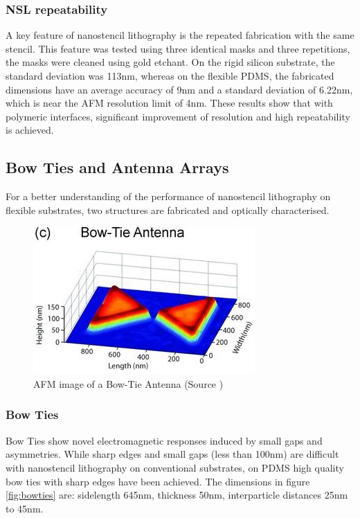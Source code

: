 \documentclass[journal, a4paper]{IEEEtran}
\begin{document}
\subsubsection{NSL repeatability}
A key feature of nanostencil lithography is the repeated fabrication with the same stencil. This feature was tested using three identical masks and three repetitions, the masks were cleaned using gold etchant. On the rigid silicon substrate, the standard deviation was 113nm, whereas on the flexible PDMS, the fabricated dimensions have an average accuracy of 9nm and a standard deviation of 6.22nm, which is near the AFM resolution limit of 4nm. These results show that with polymeric interfaces, significant improvement of resolution and high repeatability is achieved.


\subsection{Bow Ties and Antenna Arrays}
For a better understanding of the performance of nanostencil lithography on flexible substrates, two structures are fabricated and optically characterised.

\begin{figure}[hbt!]
\begin{center}
\includegraphics[width=0.9\columnwidth]{08bowtie.jpg}
\caption{AFM image of a Bow-Tie Antenna (Source \cite{paper})}
\label{fig:bowtie}
\end{center}
\end{figure}

\subsubsection{Bow Ties}
Bow Ties show novel electromagnetic responses induced by small gaps and asymmetries. While sharp edges and small gaps (less than 100nm) are difficult with nanostencil lithography on conventional substrates, on PDMS high quality bow ties with sharp edges have been achieved. The dimensions in figure \ref{fig:bowties} are: sidelength 645nm, thickness 50nm, interparticle distances 25nm to 45nm.
\end{document}
